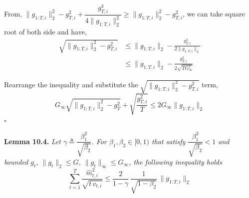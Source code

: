 \documentclass[11pt]{article}
\begin{document}
\noindent
From,
$\|g_{1:T,i}\|_2^2 - g_{T,i}^2 + \dfrac{g_{T,i}^4}{4\|g_{1:T,i}\|_2^2}
 \geq \|g_{1:T,i}\|_2^2 - g_{T,i}^2$,
we can take square root of both side and have,
\begin{align*}
\sqrt{\|g_{1:T,i}\|_2^2 - g_{T,i}^2}
 &\leq \|g_{1:T,i}\|_2 - \frac{g_{T,i}^2}{2 \|g_{1:T,i}\|_2} \\
 &\leq \|g_{1:T,i}\|_2 - \frac{g_{T,i}^2}{2 \sqrt{T G_\infty^2}}
\end{align*}

\noindent
Rearrange the inequality and substitute the
$\sqrt{\|g_{1:T,i}\|_2^2 - g_{T,i}^2}$ term,
\[
G_\infty \sqrt{\|g_{1:T,i}\|_2^2 - g_T^2}
 + \sqrt{\frac{g_{T,i}^2}{T}}
 \leq 2 G_\infty \|g_{1:T,i}\|_2
\]
\hfill$\square$


\newpage

\setcounter{equation}{12}

\noindent\textbf{Lemma 10.4.} \emph{Let
$\gamma \triangleq \dfrac{\beta_1^2}{\sqrt{\beta_2}}$. For
$\beta_1, \beta_2 \in [0, 1)$ that satisfy
$\dfrac{\beta_1^2}{\sqrt{\beta_2}} < 1$ and bounded $g_t$,
$\|g_t\|_2 \leq G$, $\|g_t\|_\infty \leq G_\infty$, the following
inequality holds}
\[
\sum_{t=1}^{T} \frac{\widehat{m}_{t,i}^2}{\sqrt{t\,\widehat{v}_{t,i}}}
 \leq \frac{2}{1 - \gamma}\,\frac{1}{\sqrt{1 - \beta_2}}\,\|g_{1:T,i}\|_2
\]
\end{document}
